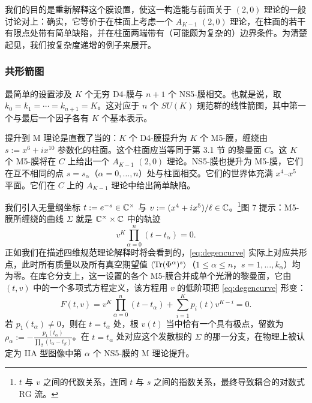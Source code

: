 我们的目的是重新解释这个膜设置，使这一构造能与前面关于 $(2,0)$ 理论的一般讨论对上：确实，它等价于在柱面上考虑一个 $A_{K-1}$ $(2,0)$ 理论，在柱面的若干有限点处带有简单缺陷，并在柱面两端带有（可能颇为复杂的）边界条件。为清楚起见，我们按复杂度递增的例子来展开。

\subsubsection{共形箭图}

最简单的设置涉及 $K$ 个无穷 D4-膜与 $n+1$ 个 NS5-膜相交。也就是说，取 $k_0 = k_1 = \cdots = k_{n+1} = K$。这对应于 $n$ 个 $SU(K)$ 规范群的线性箭图，其中第一个与最后一个因子各有 $K$ 个基本表示。

提升到 M 理论是直截了当的：$K$ 个 D4-膜提升为 $K$ 个 M5-膜，缠绕由 $s := x^6 + i x^{10}$ 参数化的柱面。这个柱面应当等同于第 3.1 节%
的黎曼面 $C$。这 $K$ 个 M5-膜将在 $C$ 上给出一个 $A_{K-1}$ $(2,0)$ 理论。NS5-膜也提升为 M5-膜，它们在互不相同的点 $s = s_\alpha$（$\alpha=0, \dots, n$）处与柱面相交。它们的世界体充满 $x^4$–$x^5$ 平面。它们在 $C$ 上的 $A_{K-1}$ 理论中给出简单缺陷。


我们引入无量纲坐标 $t := e^{-s} \in \mathbb{C}^\times$ 与 $v := (x^4 + i x^5)/\ell \in \mathbb{C}$。\footnote{$t$ 与 $v$ 之间的代数关系，连同 $t$ 与 $s$ 之间的指数关系，最终导致耦合的对数式 RG 流。}图 7%
提示：M5-膜所缠绕的曲线 $\Sigma$ 就是 $\mathbb{C}^\times \times \mathbb{C}$ 中的轨迹
\begin{equation}\label{eq:degencurve}
v^K \prod_{\alpha = 0 }^n (t-t_\alpha) = 0.
\end{equation}
正如我们在描述四维规范理论解释时将会看到的，\eqref{eq:degencurve} 实际上对应共形点，此时所有质量以及所有真空期望值 $\langle {\operatorname{Tr}} (\Phi^{\alpha})^s \rangle $（$1\leq \alpha \leq n$，$s=1,\dots, k_\alpha$）均为零。在库仑分支上，这一设置的各个 M5-膜合并成单个光滑的黎曼面，它由 $(t,v)$ 中的一个多项式方程定义，该方程用 $v$ 的低阶项把 \eqref{eq:degencurve} 形变：
\begin{equation}\label{eq:swcurve1}
F(t,v) = v^K \prod_{\alpha =0 }^n (t-t_\alpha) + \sum_{i=1}^K p_i(t) v^{K-i} = 0.
\end{equation}
若 $p_1(t_\alpha)\not=0$，则在 $t = t_\alpha$ 处，根 $v(t)$ 当中恰有一个具有极点，留数为 $\rho_\alpha:=-\frac{p_1(t_\alpha)}{\prod_\beta (t_\alpha-t_\beta)}$。在 $t=t_\alpha$ 处对应这个发散根的 $\Sigma$ 的那一分支，在物理上被认定为 IIA 型图像中第 $\alpha$ 个 NS5-膜的 M 理论提升。

